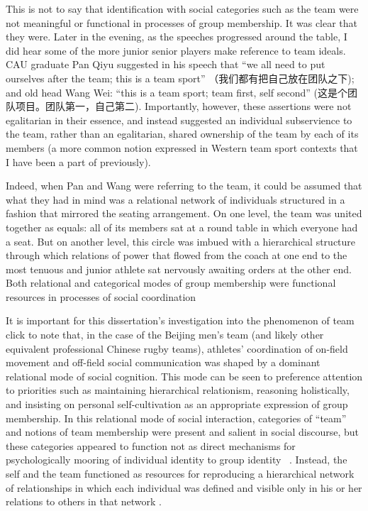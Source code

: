 \begin{CJK}{UTF8}{gbsn}
This is not to say that identification with social categories such as the team were not meaningful or functional in processes of group membership. It was clear that they were.  Later in the evening, as the speeches progressed around the table, I did hear some of the more junior senior players make reference to team ideals.  CAU graduate Pan Qiyu suggested in his speech that ``we all need to put ourselves after the team; this is a team sport'' （我们都有把自己放在团队之下); and old head Wang Wei: ``this is a team sport; team first, self second'' (这是个团队项目。团队第一，自己第二).  Importantly, however, these assertions were not egalitarian in their essence, and instead suggested an individual subservience to the team, rather than an egalitarian, shared ownership of the team by each of its members (a more common notion expressed in Western team sport contexts that I have been a part of previously).

Indeed, when Pan and Wang were referring to the team, it could be assumed that what they had in mind was a relational network of individuals structured in a fashion that mirrored the seating arrangement. On one level, the team was united together as equals: all of its members sat at a round table in which everyone had a seat. But on another level, this circle was imbued with a hierarchical structure through which relations of power that flowed from the coach at one end to the most tenuous and junior athlete sat nervously awaiting orders at the other end.  Both relational and categorical modes of group membership were functional resources in processes of social coordination

It is important for this dissertation's investigation into the phenomenon of team click to note that, in the case of the Beijing men’s team (and likely other equivalent professional Chinese rugby teams), athletes’ coordination of on-field movement and off-field social communication was shaped by a dominant relational mode of social cognition.  This mode can be seen to preference attention to priorities such as maintaining hierarchical relationism, reasoning holistically, and insisting on personal self-cultivation as an appropriate expression of group membership.  In this relational mode of social interaction, categories of ``team'' and notions of team membership were present and salient in social discourse, but these categories appeared to function not as direct mechanisms for psychologically mooring of individual identity to group identity ~\citep[as social identification theory would have it, see][]{Turner1987}.  Instead, the self and the team functioned as resources for reproducing a hierarchical network of relationships in which each individual was defined and visible only in his or her relations to others in that network \cite{Yuki2003}.


\end{CJK}
